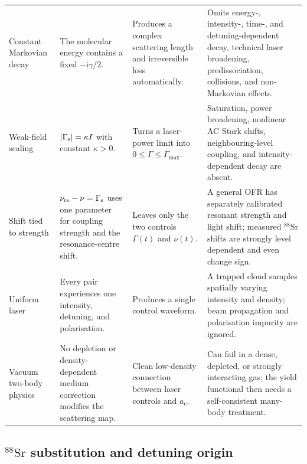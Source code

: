 \documentclass[9pt,a4paper,twocolumn,twoside]{rho-class/rho}
\newcommand{\ac}{a_{\mathrm{c}}}
\newcommand{\ii}{\mathrm{i}}
\begin{document}
\begin{table}[!t]
\begin{tabular}{>{\raggedright\arraybackslash}p{}>{\raggedright\arraybackslash}p{}>{\raggedright\arraybackslash}p{}>{\raggedright\arraybackslash}p{}}
                Constant Markovian decay & The molecular energy contains a fixed $-\ii\gamma/2$. & Produces a complex scattering length and irreversible loss automatically. & Omits energy-, intensity-, time-, and detuning-dependent decay, technical laser broadening, predissociation, collisions, and non-Markovian effects. \\
                Weak-field scaling & $|\Gamma_{\rm s}|=\kappa I$ with constant $\kappa>0$. & Turns a laser-power limit into $0\leq\Gamma\leq\Gamma_{\max}$. & Saturation, power broadening, nonlinear AC Stark shifts, neighbouring-level coupling, and intensity-dependent decay are absent. \\
                Shift tied to strength & $\nu_{\rm re}-\nu=\Gamma_{\rm s}$ uses one parameter for coupling strength and the resonance-centre shift. & Leaves only the two controls $\Gamma(t)$ and $\nu(t)$. & A general OFR has separately calibrated resonant strength and light shift; measured $^{88}\mathrm{Sr}$ shifts are strongly level dependent and even change sign. \\
                Uniform laser & Every pair experiences one intensity, detuning, and polarisation. & Produces a single control waveform. & A trapped cloud samples spatially varying intensity and density; beam propagation and polarisation impurity are ignored. \\
                Vacuum two-body physics & No depletion or density-dependent medium correction modifies the scattering map. & Clean low-density connection between laser controls and $\ac$. & Can fail in a dense, depleted, or strongly interacting gas; the yield functional then needs a self-consistent many-body treatment. \\
                \bottomrule
            \end{tabular}
        \end{table}

    \subsection{$^{88}\mathrm{Sr}$ substitution and detuning origin}
\end{document}
